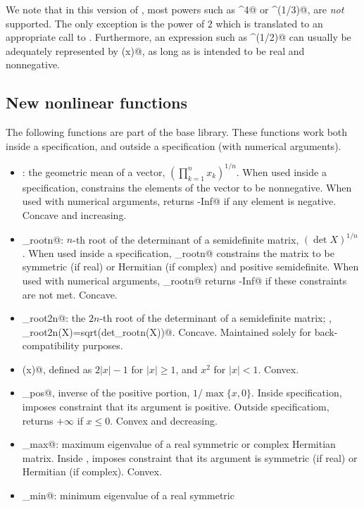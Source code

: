 \documentclass[12pt]{article}
\begin{document}
We note that in this version of \cvx, most powers such as \verb@x^4@
or \verb@x^(1/3)@, are \emph{not} supported. The only exception is
the power of $2$ which is translated to an appropriate call to 
\verb@square@. Furthermore, an expression such as \verb@x^(1/2)@ can
usually be adequately represented by \verb@sqrt(x)@, as long as \verb@x@
is intended to be real and nonnegative.

\subsection{New nonlinear functions}

The following functions are part of the base \cvx library.
These functions work both inside a \cvx specification,
and outside a \cvx specification (with numerical arguments).
\begin{itemize}
\item \verb@geomean@: the geometric mean of a vector, $\left( \prod_{k=1}^n x_k \right)^{1/n}$. When
used inside a \cvx specification, \verb@geomean@ constrains the elements of the vector
to be nonnegative. When used with numerical arguments, \verb@geomean@ returns \verb@-Inf@
if any element is negative.
Concave and increasing.
\item \verb@det_rootn@: $n$-th root of the determinant of a semidefinite matrix,
$(\det X)^{1/n}$. When used inside a \cvx specification, \verb@det_rootn@ constrains
the matrix to be symmetric (if real) or Hermitian (if complex) and positive semidefinite. 
When used with numerical arguments, \verb@det_rootn@ returns \verb@-Inf@ if these
constraints are not met. Concave.
\item \verb@det_root2n@: the $2n$-th root of the determinant of a semidefinite
matrix; \ie, \verb@det_root2n(X)=sqrt(det_rootn(X))@. Concave. Maintained
solely for back-compatibility purposes.
\item \verb@huber(x)@, defined as $2|x|-1$ for $|x|\geq 1$,
and $x^2$ for $|x|<1$.  Convex.
\item \verb@inv_pos@, inverse of the positive portion, $1/\max\{x,0\}$.
Inside \cvx specification,
imposes constraint that its argument is positive.
Outside \cvx specificatiom, returns $+\infty$ if $x\leq 0$.
Convex and decreasing.
\item \verb@lambda_max@: maximum eigenvalue of a real symmetric 
or complex Hermitian matrix.
Inside \cvx, imposes constraint that its argument 
is symmetric (if real) or Hermitian (if complex).
Convex.
\item \verb@lambda_min@: minimum eigenvalue of a real symmetric 

\end{itemize}
\end{document}
